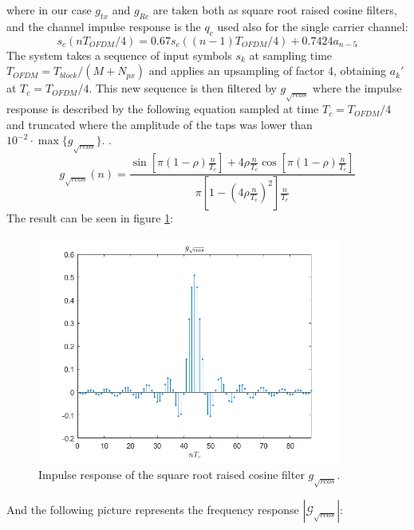 \documentclass[a4paper,11.5pt]{article}
\begin{document}
where in our case $g_{tx}$ and $g_{Rc}$ are taken both as square root raised cosine filters, and the channel impulse response is the $q_c$ used also for the single carrier channel: 
\begin{equation}\label{eq:q_c}
s_c(nT_{OFDM}/4) = 0.67 s_c((n-1)T_{OFDM}/4) + 0.7424 a_{n-5}
\end{equation}
The system takes a sequence of input symbols $s_k$ at sampling time $T_{OFDM}=T_{block}/(M + N_{px})$ and applies an upsampling of factor 4, obtaining $a_k'$ at $T_c = T_{OFDM}/4$. This new sequence is then filtered by $g_{\sqrt{rcos}}$ where the impulse response is described by the following equation sampled at time $T_c=T_{OFDM}/4$ and truncated where the amplitude of the taps was lower than $10^{-2} \cdot \max\{g_{\sqrt{rcos}}\}$. 
.
\begin{equation}\label{eq:g_rcos}
g_{\sqrt{rcos}}(n) = \frac{\sin\left[\pi\left(1 - \rho\right)\frac{n}{T_c}\right] + 4\rho\frac{n}{T_c}\cos\left[\pi\left(1 - \rho\right)\frac{n}{T_c}\right]}{\pi\left[1-\left(4\rho\frac{n}{T_c}\right)^2\right]\frac{n}{T_c}}
\end{equation}
The result can be seen in figure \ref{fig:gimp_rcos}:


\begin{figure}[H]
	\begin{center}   
		\includegraphics[width=10cm]{figs/gimp_rcos.png} 
		\caption{Impulse response of the square root raised cosine filter $g_{\sqrt{rcos}}$.}
		\label{fig:gimp_rcos}
	\end{center}
\end{figure}

And the following picture represents the frequency response $|\mathcal{G}_{\sqrt{rcos}}|$:
\end{document}

